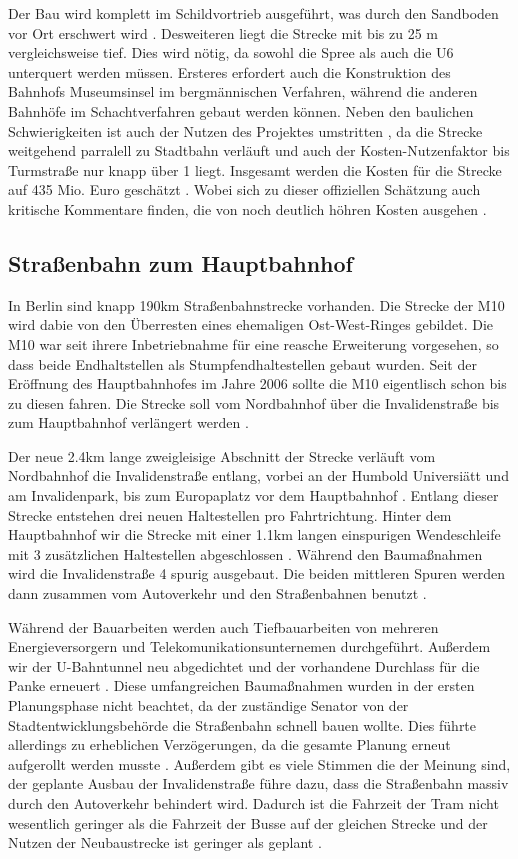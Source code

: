 Der Bau wird komplett im Schildvortrieb ausgeführt, was durch den Sandboden vor
Ort erschwert wird \cite{bkhU5}. Desweiteren liegt die Strecke mit bis zu 25 m
vergleichsweise tief. Dies wird nötig, da sowohl die Spree als auch die U6
unterquert werden müssen. Ersteres erfordert auch die Konstruktion des Bahnhofs
Museumsinsel im bergmännischen Verfahren, während die anderen Bahnhöfe im
Schachtverfahren gebaut werden können. Neben den baulichen Schwierigkeiten ist
auch der Nutzen des Projektes umstritten \cite{ftdU5}, da die Strecke weitgehend
parralell zu Stadtbahn verläuft und auch der Kosten-Nutzenfaktor bis Turmstraße
nur knapp über 1 liegt. Insgesamt werden die Kosten für die Strecke auf 435
Mio. Euro geschätzt \cite{bwwwU5}. Wobei sich zu dieser offiziellen Schätzung
auch kritische Kommentare finden, die von noch deutlich höhren Kosten ausgehen
\cite{ftdU5}.

\subsection*{Straßenbahn zum Hauptbahnhof}

In Berlin sind knapp 190km Straßenbahnstrecke vorhanden. Die Strecke
der M10 wird dabie von den Überresten eines ehemaligen Ost-West-Ringes
gebildet. Die M10 war seit ihrere Inbetriebnahme für eine reasche
Erweiterung vorgesehen, so dass beide Endhaltstellen als
Stumpfendhaltestellen gebaut wurden. Seit der Eröffnung des
Hauptbahnhofes im Jahre 2006 sollte die M10 eigentlisch schon bis zu
diesen fahren. Die Strecke soll vom Nordbahnhof über die
Invalidenstraße bis zum Hauptbahnhof verlängert
werden \cite{tsM10}.

Der neue 2.4km lange zweigleisige Abschnitt der Strecke verläuft vom
Nordbahnhof die Invalidenstraße entlang, vorbei an der Humbold
Universiätt und am Invalidenpark, bis zum Europaplatz vor dem
Hauptbahnhof \cite{M10bInfo}. Entlang dieser Strecke entstehen
drei neuen Haltestellen pro Fahrtrichtung. Hinter dem Hauptbahnhof wir
die Strecke mit einer 1.1km langen einspurigen Wendeschleife
mit 3 zusätzlichen Haltestellen abgeschlossen \cite{zdfM10}. Während
den Baumaßnahmen wird die Invalidenstraße 4 spurig ausgebaut. Die
beiden mittleren Spuren werden dann zusammen vom Autoverkehr und den
Straßenbahnen benutzt \cite{flyerInvalidestr}.

Während der Bauarbeiten werden auch Tiefbauarbeiten von mehreren
Energieversorgern und Telekomunikationsunternemen
durchgeführt. Außerdem wir der U-Bahntunnel neu abgedichtet und
der vorhandene Durchlass für die Panke
erneuert \cite{flyerInvalidestr}. Diese umfangreichen Baumaßnahmen
wurden in der ersten Planungsphase nicht beachtet, da der zuständige
Senator von der Stadtentwicklungsbehörde die Straßenbahn schnell bauen
wollte. Dies führte allerdings zu erheblichen Verzögerungen, da die
gesamte Planung erneut aufgerollt werden
musste \cite{bzSchnell}. Außerdem gibt es viele Stimmen die der Meinung
sind, der geplante Ausbau der Invalidenstraße führe dazu, dass die
Straßenbahn massiv durch den Autoverkehr behindert wird. Dadurch ist
die Fahrzeit der Tram nicht wesentlich geringer als die Fahrzeit der
Busse auf der gleichen Strecke und der Nutzen der Neubaustrecke ist
geringer als geplant \cite{protram}.

